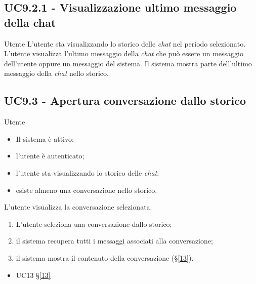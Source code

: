 \subsection{UC9.2.1 - Visualizzazione ultimo messaggio della chat}
\label{9.2.1}
\makeUC{}
{Utente}
{L'utente sta visualizzando lo storico delle \textit{chat} nel periodo selezionato.}
{L'utente visualizza l'ultimo messaggio della \textit{chat} che può essere un messaggio dell'utente 
oppure un messaggio del sistema.}
{Il sistema mostra parte dell'ultimo messaggio della \textit{chat} nello storico.}{}{}{}{}

\subsection{UC9.3 - Apertura conversazione dallo storico}
\label{9.3}
{Utente}
{
    \begin{itemize}
        \item Il sistema è attivo;
        \item l'utente è autenticato;
        \item l'utente sta visualizzando lo storico delle \textit{chat};
        \item esiste almeno una conversazione nello storico.
    \end{itemize}
}
{L'utente visualizza la conversazione selezionata.}
{
    \begin{enumerate}
        \item L'utente seleziona una conversazione dallo storico;
        \item il sistema recupera tutti i messaggi associati alla conversazione;
        \item il sistema mostra il contenuto della conversazione (§\ref{13}).
    \end{enumerate}
}
{
    \begin{itemize}
        \item UC13 §\ref{13}
    \end{itemize}
}
{}{}{}


